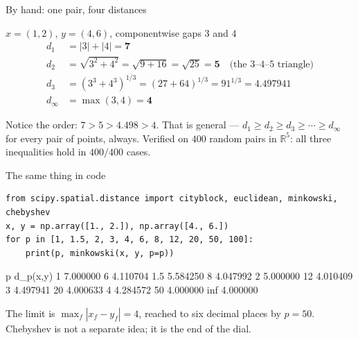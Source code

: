 \documentclass[aspectratio=169]{beamer}
\begin{document}
\begin{frame}[shrink=5]{By hand: one pair, four distances}
  \begin{exampleblock}{$x = (1,2)$, \quad $y = (4,6)$, \quad componentwise
    gaps $3$ and $4$}
    \begin{align*}
      d_1 &= |3| + |4| = \mathbf{7} \\[0.15em]
      d_2 &= \sqrt{3^2 + 4^2} = \sqrt{9+16} = \sqrt{25} = \mathbf{5}
        \quad \text{(the 3--4--5 triangle)} \\[0.15em]
      d_3 &= (3^3 + 4^3)^{1/3} = (27 + 64)^{1/3} = 91^{1/3}
        = \mathbf{4.497941} \\[0.15em]
      d_\infty &= \max(3, 4) = \mathbf{4}
    \end{align*}
  \end{exampleblock}
  \begin{center}
    \small Notice the order: $7 > 5 > 4.498 > 4$. That is general ---
    $d_1 \ge d_2 \ge d_3 \ge \cdots \ge d_\infty$ for every pair of points,
    always. Verified on $400$ random pairs in $\mathbb{R}^5$: all three
    inequalities hold in $400/400$ cases.
  \end{center}
\end{frame}

\begin{frame}[fragile,shrink=3]{The same thing in code}
\begin{lstlisting}
from scipy.spatial.distance import cityblock, euclidean, minkowski, chebyshev
x, y = np.array([1., 2.]), np.array([4., 6.])
for p in [1, 1.5, 2, 3, 4, 6, 8, 12, 20, 50, 100]:
    print(p, minkowski(x, y, p=p))
\end{lstlisting}
\begin{outblk}
     p      d_p(x,y)
     1      7.000000        6      4.110704
   1.5      5.584250        8      4.047992
     2      5.000000       12      4.010409
     3      4.497941       20      4.000633
     4      4.284572       50      4.000000
                          inf      4.000000
\end{outblk}
  \begin{center}
    \small The limit is $\max_f |x_f - y_f| = 4$, reached to six decimal
    places by $p = 50$. Chebyshev is not a separate idea; it is the end of
    the dial.
  \end{center}
\end{frame}
\end{document}
